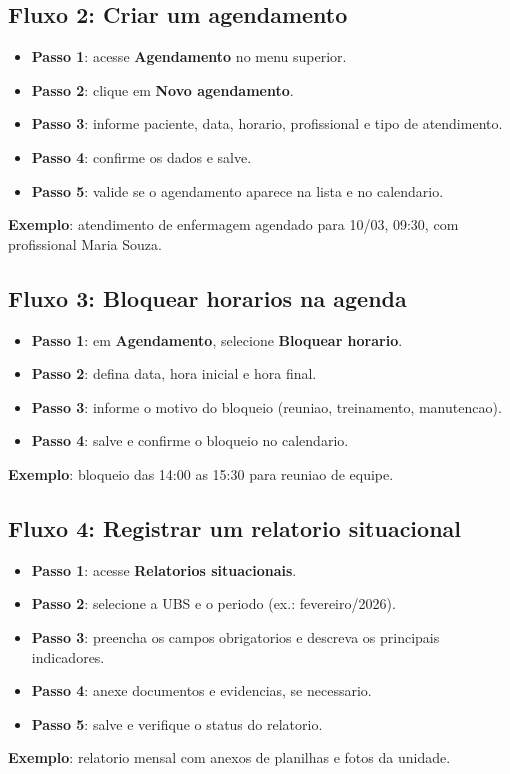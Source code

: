 \documentclass[12pt,a4paper]{article}
\begin{document}
\subsection{Fluxo 2: Criar um agendamento}
\begin{itemize}[leftmargin=*]
  \item \textbf{Passo 1}: acesse \textbf{Agendamento} no menu superior.
  \item \textbf{Passo 2}: clique em \textbf{Novo agendamento}.
  \item \textbf{Passo 3}: informe paciente, data, horario, profissional e tipo de atendimento.
  \item \textbf{Passo 4}: confirme os dados e salve.
  \item \textbf{Passo 5}: valide se o agendamento aparece na lista e no calendario.
\end{itemize}
\textbf{Exemplo}: atendimento de enfermagem agendado para 10/03, 09:30, com profissional Maria Souza.

\subsection{Fluxo 3: Bloquear horarios na agenda}
\begin{itemize}[leftmargin=*]
  \item \textbf{Passo 1}: em \textbf{Agendamento}, selecione \textbf{Bloquear horario}.
  \item \textbf{Passo 2}: defina data, hora inicial e hora final.
  \item \textbf{Passo 3}: informe o motivo do bloqueio (reuniao, treinamento, manutencao).
  \item \textbf{Passo 4}: salve e confirme o bloqueio no calendario.
\end{itemize}
\textbf{Exemplo}: bloqueio das 14:00 as 15:30 para reuniao de equipe.

\subsection{Fluxo 4: Registrar um relatorio situacional}
\begin{itemize}[leftmargin=*]
  \item \textbf{Passo 1}: acesse \textbf{Relatorios situacionais}.
  \item \textbf{Passo 2}: selecione a UBS e o periodo (ex.: fevereiro/2026).
  \item \textbf{Passo 3}: preencha os campos obrigatorios e descreva os principais indicadores.
  \item \textbf{Passo 4}: anexe documentos e evidencias, se necessario.
  \item \textbf{Passo 5}: salve e verifique o status do relatorio.
\end{itemize}
\textbf{Exemplo}: relatorio mensal com anexos de planilhas e fotos da unidade.
\end{document}
